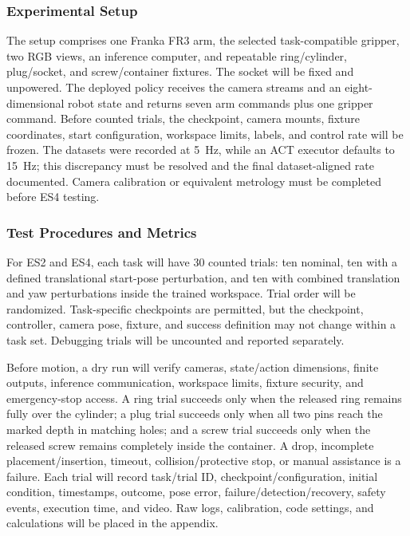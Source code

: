 \documentclass[12pt, letterpaper]{article}
\begin{document}
\subsubsection{Experimental Setup}

The setup comprises one Franka FR3 arm, the selected task-compatible gripper,
two RGB views, an inference computer, and repeatable ring/cylinder,
plug/socket, and screw/container fixtures. The socket will be fixed and
unpowered. The deployed policy receives the camera streams and an
eight-dimensional robot state and returns seven arm commands plus one gripper
command. Before counted trials, the checkpoint, camera mounts, fixture
coordinates, start configuration, workspace limits, labels, and control rate
will be frozen. The datasets were recorded at 5~Hz, while an ACT executor
defaults to 15~Hz; this discrepancy must be resolved and the final
dataset-aligned rate documented. Camera calibration or equivalent metrology
must be completed before ES4 testing.

\subsubsection{Test Procedures and Metrics}

For ES2 and ES4, each task will have 30 counted trials: ten nominal, ten with a
defined translational start-pose perturbation, and ten with combined translation
and yaw perturbations inside the trained workspace. Trial order will be
randomized. Task-specific checkpoints are permitted, but the checkpoint,
controller, camera pose, fixture, and success definition may not change within
a task set. Debugging trials will be uncounted and reported separately.

Before motion, a dry run will verify cameras, state/action dimensions, finite
outputs, inference communication, workspace limits, fixture security, and
emergency-stop access. A ring trial succeeds only when the released ring
remains fully over the cylinder; a plug trial succeeds only when all two pins
reach the marked depth in matching holes; and a screw trial succeeds only when
the released screw remains completely inside the container. A drop, incomplete
placement/insertion, timeout, collision/protective stop, or manual assistance is
a failure. Each trial will record task/trial ID, checkpoint/configuration,
initial condition, timestamps, outcome, pose error, failure/detection/recovery,
safety events, execution time, and video. Raw logs, calibration, code settings,
and calculations will be placed in the appendix.
\end{document}
